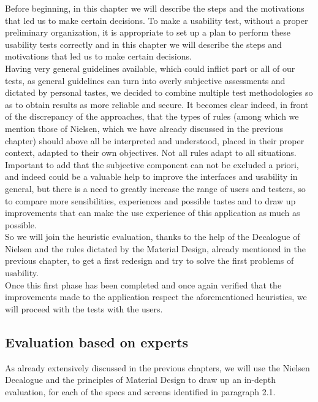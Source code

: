 \lhead{}
Before beginning, in this chapter we will describe the steps and the motivations that led us to make certain decisions. To make a usability test, without a proper preliminary organization, it is appropriate to set up a plan to perform these usability tests correctly and in this chapter we will describe the steps and motivations that led us to make certain decisions.\\
Having very general guidelines available, which could inflict part or all of our tests, as general guidelines can turn into overly subjective assessments and dictated by personal tastes, we decided to combine multiple test methodologies so as to obtain results as more reliable and secure. It becomes clear indeed, in front of the discrepancy of the approaches, that the types of rules (among which we mention those of Nielsen, which we have already discussed in the previous chapter) should above all be interpreted and understood, placed in their proper context, adapted to their own objectives. Not all rules adapt to all situations.\\
Important to add that the subjective component can not be excluded a priori, and indeed could be a valuable help to improve the interfaces and usability in general, but there is a need to greatly increase the range of users and testers, so to compare more sensibilities, experiences and possible tastes and to draw up improvements that can make the use experience of this application as much as possible.\\
So we will join the heuristic evaluation, thanks to the help of the Decalogue of Nielsen and the rules dictated by the Material Design, already mentioned in the previous chapter, to get a first redesign and try to solve the first problems of usability.\\
Once this first phase has been completed and once again verified that the improvements made to the application respect the aforementioned heuristics, we will proceed with the tests with the users.

\subsection{Evaluation based on experts}
As already extensively discussed in the previous chapters, we will use the Nielsen Decalogue and the principles of Material Design to draw up an in-depth evaluation, for each of the specs and screens identified in paragraph 2.1.
